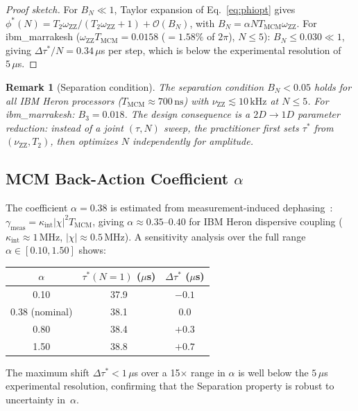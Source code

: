 \documentclass[10pt,twocolumn]{article}
\newtheorem{remark}{Remark}
\newcommand{\nuZZ}{\nu_{\mathrm{ZZ}}}
\newcommand{\oZZ}{\omega_{\mathrm{ZZ}}}
\newcommand{\Tmc}{T_{\mathrm{MCM}}}
\newcommand{\taustar}{\tau^*}
\begin{document}
\begin{proof}[Proof sketch]
For $B_N \ll 1$, Taylor expansion of Eq.~\eqref{eq:phiopt} gives
$\phi^*(N) = T_2\oZZ/(T_2\oZZ+1) + \mathcal{O}(B_N)$,
with $B_N = \alpha N\Tmc\oZZ$.
For ibm\_marrakesh ($\oZZ\Tmc = 0.0158$ ($= 1.58\%$ of $2\pi$), $N \le 5$):
$B_N \le 0.030 \ll 1$, giving $\Delta\taustar/N = 0.34\,\mu$s per step,
which is below the experimental resolution of $5\,\mu$s.
\end{proof}

\begin{remark}[Separation condition]
\label{rem:separation}
The separation condition $B_N < 0.05$ holds for all IBM Heron processors
($\Tmc \approx 700\,\mathrm{ns}$) with $\nuZZ \lesssim 10\,\mathrm{kHz}$
at $N \le 5$.
For ibm\_marrakesh: $B_3 = 0.018$.
The design consequence is a $2D \to 1D$ parameter reduction:
instead of a joint $(\tau, N)$ sweep, the practitioner first sets
$\taustar$ from $(\nuZZ, T_2)$, then optimizes $N$ independently
for amplitude.
\end{remark}

\subsection{MCM Back-Action Coefficient \texorpdfstring{$\alpha$}{alpha}}
\label{sec:alpha}

The coefficient $\alpha = 0.38$ is estimated from measurement-induced
dephasing~\cite{Gambetta2012,Blais2004}:
$\gamma_\mathrm{meas} = \kappa_\mathrm{int}|\chi|^2\Tmc$, giving
$\alpha \approx 0.35$--$0.40$ for IBM Heron dispersive coupling
($\kappa_\mathrm{int} \approx 1\,\mathrm{MHz}$,
$|\chi| \approx 0.5\,\mathrm{MHz}$).
A sensitivity analysis over the full range $\alpha \in [0.10, 1.50]$
shows:
\begin{center}
\small
\begin{tabular}{ccc}
\toprule
$\alpha$ & $\taustar(N{=}1)$ ($\mu$s) & $\Delta\taustar$ ($\mu$s) \\
\midrule
0.10 & 37.9 & $-0.1$ \\
0.38 (nominal) & 38.1 & $0.0$ \\
0.80 & 38.4 & $+0.3$ \\
1.50 & 38.8 & $+0.7$ \\
\bottomrule
\end{tabular}
\end{center}
The maximum shift $\Delta\taustar < 1\,\mu$s over a 15$\times$ range in $\alpha$
is well below the $5\,\mu$s experimental resolution,
confirming that the Separation property is robust to uncertainty in~$\alpha$.
\end{document}
